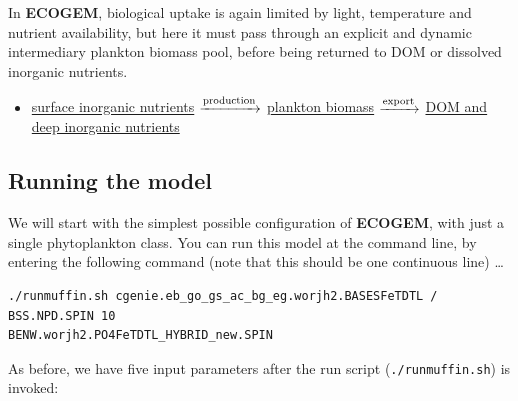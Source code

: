 \documentclass[11pt,fleqn]{book} %
\begin{document}
In \textbf{ECOGEM}, biological uptake is again limited by light, temperature and nutrient availability, but here it must pass through an explicit and dynamic intermediary plankton biomass pool, before being returned to DOM or dissolved inorganic nutrients.

\vspace{4mm}
\begin{itemize}
\item \underline{surface inorganic nutrients} $\xrightarrow[]{\rm production}$ \underline{plankton biomass} $\xrightarrow[]{\rm export}$ \underline{DOM and deep inorganic nutrients}
\end{itemize}
\vspace{4mm}


\subsection{Running the model}

We will start with the simplest possible configuration of \textbf{ECOGEM}, with just a single phytoplankton class. You can run this model at the command line, by entering the following command (note that this should be one continuous line) \dots

\small\begin{verbatim}
./runmuffin.sh cgenie.eb_go_gs_ac_bg_eg.worjh2.BASESFeTDTL / BSS.NPD.SPIN 10 
BENW.worjh2.PO4FeTDTL_HYBRID_new.SPIN
\end{verbatim}\normalsize

\noindent As before, we have five input parameters after  the run script (\texttt{./runmuffin.sh}) is invoked:
\end{document}
